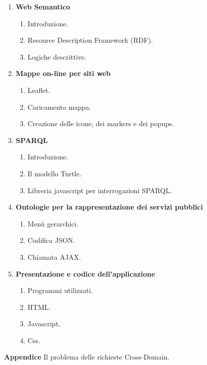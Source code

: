 \documentclass[a4paper,11pt]{article}
\begin{document}
\begin{enumerate}
	\item \LARGE{\textbf{Web Semantico}}
		\begin{enumerate}
			\Large
			\item Introduzione.
			\item Resource Description Framework (RDF).
			\item Logiche descrittive.
		\end{enumerate}
	\bigskip
	\item \LARGE{\textbf{Mappe on-line per siti web}}
		\begin{enumerate}
			\Large
			\item Leaflet.
			\item Caricamento mappa.
			\item Creazione delle icone, dei markers e dei popups.
		\end{enumerate}
	\bigskip 
	\item \LARGE{\textbf{SPARQL}}
		\begin{enumerate}
			\Large
			\item Introduzione.
			\item Il modello Turtle.
			\item Libreria javascript per interrogazioni SPARQL.
		\end{enumerate}
	\bigskip 
	\item \LARGE{\textbf{Ontologie per la rappresentazione dei servizi pubblici}}
		\begin{enumerate}
			\Large
			\item Menù gerarchici.
			\item Codifica JSON.
			\item Chiamata AJAX.
		\end{enumerate}
	\bigskip 
	\item \LARGE{\textbf{Presentazione e codice dell'applicazione}}
		\begin{enumerate}
			\Large
			\item Programmi utilizzati.
			\item HTML.
			\item Javascript.
			\item Css.
		\end{enumerate}
\end{enumerate}
\bigskip 
		
\textbf {Appendice} Il problema delle richieste Cross-Domain.
\newpage
\end{document}
